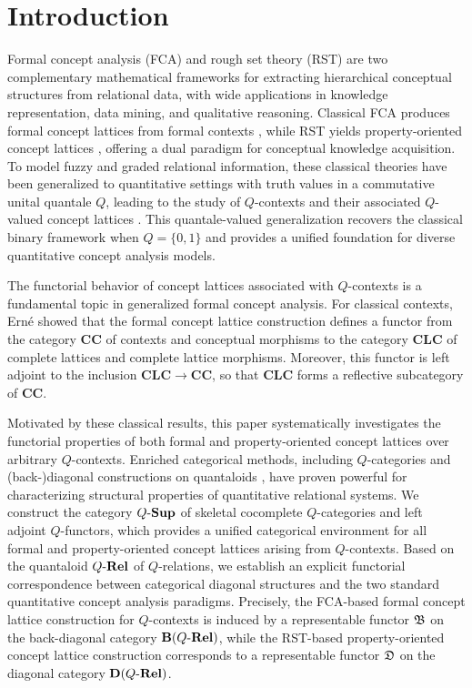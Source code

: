 \documentclass{tac}
\begin{document}
\section{Introduction}
Formal concept analysis (FCA) and rough set theory (RST) are two complementary mathematical frameworks for extracting hierarchical conceptual structures from relational data, with wide applications in knowledge representation, data mining, and qualitative reasoning. Classical FCA produces formal concept lattices from formal contexts \cite{Ganter2024, Wille1982}, while RST yields property-oriented concept lattices \cite{Duntsch2002, Pawlak1982, Yao2004}, offering a dual paradigm for conceptual knowledge acquisition. To model fuzzy and graded relational information, these classical theories have been generalized to quantitative settings with truth values in a commutative unital quantale \(Q\), leading to the study of \(Q\)-contexts and their associated \(Q\)-valued concept lattices \cite{Belohlavek2002, Belohlavek2004, Georgescu2004, LaiZhang2009, Popescu2004}. This quantale-valued generalization recovers the classical binary framework when \(Q=\{0,1\}\) and provides a unified foundation for diverse quantitative concept analysis models.

The functorial behavior of concept lattices associated with \(Q\)-contexts is a fundamental topic in generalized formal concept analysis. For classical contexts, Ern\'{e} \cite{Erne1994,Erne2014} showed that the formal concept lattice construction defines a functor from the category \(\mathbf{CC}\) of contexts and conceptual morphisms to the category \(\mathbf{CLC}\) of complete lattices and complete lattice morphisms. Moreover, this functor is left adjoint to the inclusion \(\mathbf{CLC}\to\mathbf{CC}\), so that \(\mathbf{CLC}\) forms a reflective subcategory of \(\mathbf{CC}\).

Motivated by these classical results, this paper systematically investigates the functorial properties of both formal and property-oriented concept lattices over arbitrary \(Q\)-contexts.
Enriched categorical methods, including \(Q\)-categories\cite{Lawvere1973, Stubbe2005a, Stubbe2005b, Stubbe2007a} and (back-)diagonal constructions on quantaloids \cite{Shen2016,Shen2021, ShenTaoZhang2016,Stubbe2014}, have proven powerful for characterizing structural properties of quantitative relational systems. We construct the category \({Q\text{-}\mathbf{Sup}}\) of skeletal cocomplete \(Q\)-categories and left adjoint \(Q\)-functors, which provides a unified categorical environment for all formal and property-oriented concept lattices arising from \(Q\)-contexts. Based on the quantaloid \(Q\text{-}\mathbf{Rel}\) of \(Q\)-relations, we establish an explicit functorial correspondence between categorical diagonal structures and the two standard quantitative concept analysis paradigms. Precisely, the FCA-based formal concept lattice construction for \(Q\)-contexts is induced by a representable functor \(\mathfrak{B}\) on the back-diagonal category \({\mathbf{B}(Q\text{-}\mathbf{Rel})}\), while the RST-based property-oriented concept lattice construction corresponds to a representable functor \(\mathfrak{D}\) on the diagonal category \({\mathbf{D}(Q\text{-}\mathbf{Rel})}\).
\end{document}
